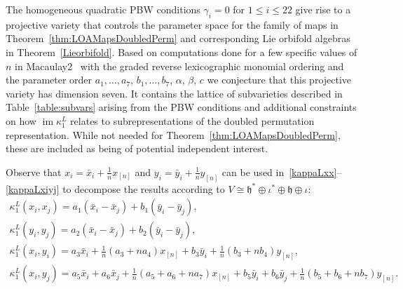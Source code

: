 \documentclass[10pt,a4paper]{amsart}
\numberwithin{equation}{section}
\newcommand{\n}[1]{{#1}_{[n]}}
\DeclareMathOperator{\im}{im}
\begin{document}
The homogeneous quadratic PBW conditions $\gamma_i=0$ for $1 \leq i \leq 22$
give rise to a projective variety that controls the parameter space for the
family of maps in Theorem~\ref{thm:LOAMapsDoubledPerm}
and corresponding Lie orbifold algebras in Theorem~\ref{Lieorbifold}.
Based on computations done
for a few specific values of $n$ in Macaulay2~\cite{M2} with the graded reverse
lexicographic monomial ordering and the
parameter order $a_1,\dots,a_7$, $b_1,\dots,b_7$, $\alpha$, $\beta$, $c$
we conjecture that this projective variety has dimen\-sion seven. It contains the
lattice of subvarieties described in Table~\ref{table:subvars} arising from
the PBW conditions and additional constraints on how $\im \kappa^L_1$ relates to
subrepresentations of the doubled permutation representation.
While not needed for Theorem~\ref{thm:LOAMapsDoubledPerm}, these are included as being of potential independent interest.

\begin{Remark}\label{rmk:subrep1}
Observe that
$x_i=\bar{x}_i+\tfrac{1}{n}x_{[n]}$ and $y_i=\bar{y}_i+\tfrac{1}{n}y_{[n]}$
can be used in~\eqref{kappaLxx}--\eqref{kappaLxiyj} to decompose the results
according to $V\cong\mathfrak{h}^* \oplus \iota^* \oplus \mathfrak{h} \oplus \iota$:
\begin{gather}
\kappa^L_1(x_i,x_j)=a_1(\bar{x}_i-\bar{x}_j)+b_1(\bar{y}_i-\bar{y}_j), \\
\kappa^L_1(y_i,y_j)=a_2(\bar{x}_i-\bar{x}_j)+b_2(\bar{y}_i-\bar{y}_j), \\
\kappa^L_1(x_i,y_i)=a_3\bar{x}_i+\frac{1}{n}(a_3+na_4)\n{x}+b_3 \bar{y}_i+\frac{1}{n}(b_3+nb_4)\n{y}, \\
\kappa^L_1(x_i,y_j)=a_5 \bar{x}_i\!+a_6 \bar{x}_j\!+\frac{1}{n}(a_5\!+a_6\!+na_7)\n{x}\!+b_5 \bar{y}_i\!+b_6 \bar{y}_j\!+\frac{1}{n}(b_5\!+b_6\!+nb_7)\n{y}.
\end{gather}
\end{Remark}
\end{document}
